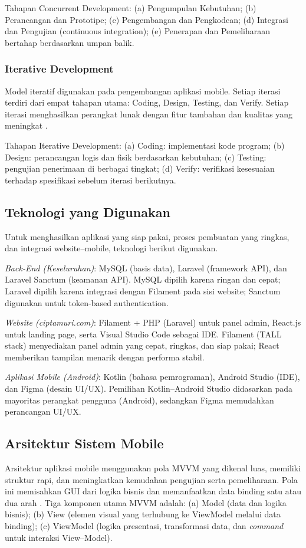 \documentclass[conference, compsoc, twoside]{IEEEtran}
\begin{document}
\noindent Tahapan Concurrent Development: (a) Pengumpulan Kebutuhan; (b) Perancangan dan Prototipe; (c) Pengembangan dan Pengkodean; (d) Integrasi dan Pengujian (continuous integration); (e) Penerapan dan Pemeliharaan bertahap berdasarkan umpan balik.

\subsubsection{Iterative Development}
Model iteratif digunakan pada pengembangan aplikasi mobile. Setiap iterasi terdiri dari empat tahapan utama: Coding, Design, Testing, dan Verify. Setiap iterasi menghasilkan perangkat lunak dengan fitur tambahan dan kualitas yang meningkat \cite{Gharajeh2019}.

\noindent Tahapan Iterative Development: (a) Coding: implementasi kode program; (b) Design: perancangan logis dan fisik berdasarkan kebutuhan; (c) Testing: pengujian penerimaan di berbagai tingkat; (d) Verify: verifikasi kesesuaian terhadap spesifikasi sebelum iterasi berikutnya.

\subsection{Teknologi yang Digunakan}
Untuk menghasilkan aplikasi yang siap pakai, proses pembuatan yang ringkas, dan integrasi website–mobile, teknologi berikut digunakan.

\noindent \textit{Back-End (Keseluruhan)}: MySQL (basis data), Laravel (framework API), dan Laravel Sanctum (keamanan API). MySQL dipilih karena ringan dan cepat; Laravel dipilih karena integrasi dengan Filament pada sisi website; Sanctum digunakan untuk token-based authentication.

\noindent \textit{Website (ciptamuri.com)}: Filament + PHP (Laravel) untuk panel admin, React.js untuk landing page, serta Visual Studio Code sebagai IDE. Filament (TALL stack) menyediakan panel admin yang cepat, ringkas, dan siap pakai; React memberikan tampilan menarik dengan performa stabil.

\noindent \textit{Aplikasi Mobile (Android)}: Kotlin (bahasa pemrograman), Android Studio (IDE), dan Figma (desain UI/UX). Pemilihan Kotlin–Android Studio didasarkan pada mayoritas perangkat pengguna (Android), sedangkan Figma memudahkan perancangan UI/UX.

\subsection{Arsitektur Sistem Mobile}
Arsitektur aplikasi mobile menggunakan pola MVVM yang dikenal luas, memiliki struktur rapi, dan meningkatkan kemudahan pengujian serta pemeliharaan. Pola ini memisahkan GUI dari logika bisnis dan memanfaatkan data binding satu atau dua arah \cite{Fuksa2024}. Tiga komponen utama MVVM adalah: (a) Model (data dan logika bisnis); (b) View (elemen visual yang terhubung ke ViewModel melalui data binding); (c) ViewModel (logika presentasi, transformasi data, dan \emph{command} untuk interaksi View–Model).
\end{document}
